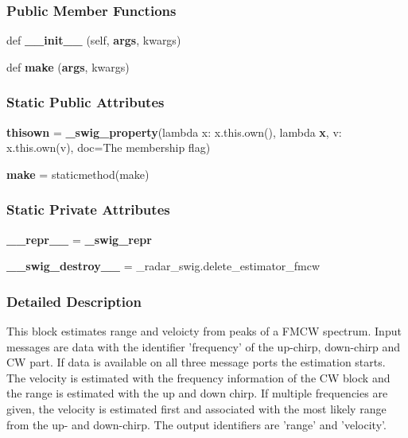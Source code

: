 \subsubsection*{Public Member Functions}
\begin{DoxyCompactItemize}
\item 
def {\bf \+\_\+\+\_\+init\+\_\+\+\_\+} (self, {\bf args}, kwargs)
\item 
def {\bf make} ({\bf args}, kwargs)
\end{DoxyCompactItemize}
\subsubsection*{Static Public Attributes}
\begin{DoxyCompactItemize}
\item 
{\bf thisown} = {\bf \+\_\+swig\+\_\+property}(lambda x\+: x.\+this.\+own(), lambda {\bf x}, v\+: x.\+this.\+own(v), doc=\textquotesingle{}The membership flag\textquotesingle{})
\item 
{\bf make} = staticmethod(make)
\end{DoxyCompactItemize}
\subsubsection*{Static Private Attributes}
\begin{DoxyCompactItemize}
\item 
{\bf \+\_\+\+\_\+repr\+\_\+\+\_\+} = {\bf \+\_\+swig\+\_\+repr}
\item 
{\bf \+\_\+\+\_\+swig\+\_\+destroy\+\_\+\+\_\+} = \+\_\+radar\+\_\+swig.\+delete\+\_\+estimator\+\_\+fmcw
\end{DoxyCompactItemize}


\subsubsection{Detailed Description}
\begin{DoxyVerb}This block estimates range and veloicty from peaks of a FMCW spectrum. Input messages are data with the identifier 'frequency' of the up-chirp, down-chirp and CW part. If data is available on all three message ports the estimation starts. The velocity is estimated with the frequency information of the CW block and the range is estimated with the up and down chirp. If multiple frequencies are given, the velocity is estimated first and associated with the most likely range from the up- and down-chirp. The output identifiers are 'range' and 'velocity'.\end{DoxyVerb}
 

